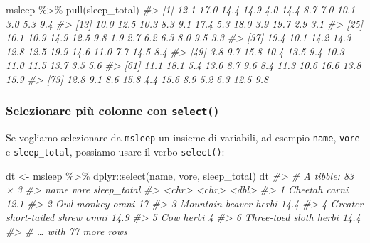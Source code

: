 \documentclass[
  10pt,
  italian,
  a4paper,
  extrafontsizes,onecolumn,openright
  ]{memoir}
\newenvironment{Shaded}{\begin{snugshade}}{\end{snugshade}}
\newcommand{\CommentTok}[1]{\textcolor[rgb]{0.56,0.35,0.01}{\textit{#1}}}
\newcommand{\FunctionTok}[1]{\textcolor[rgb]{0.00,0.00,0.00}{#1}}
\newcommand{\NormalTok}[1]{#1}
\newcommand{\OtherTok}[1]{\textcolor[rgb]{0.56,0.35,0.01}{#1}}
\newcommand{\SpecialCharTok}[1]{\textcolor[rgb]{0.00,0.00,0.00}{#1}}
\begin{document}
\begin{Shaded}
\begin{Highlighting}[]
\NormalTok{msleep }\SpecialCharTok{\%\textgreater{}\%} 
  \FunctionTok{pull}\NormalTok{(sleep\_total)}
\CommentTok{\#\textgreater{}  [1] 12.1 17.0 14.4 14.9  4.0 14.4  8.7  7.0 10.1  3.0  5.3  9.4}
\CommentTok{\#\textgreater{} [13] 10.0 12.5 10.3  8.3  9.1 17.4  5.3 18.0  3.9 19.7  2.9  3.1}
\CommentTok{\#\textgreater{} [25] 10.1 10.9 14.9 12.5  9.8  1.9  2.7  6.2  6.3  8.0  9.5  3.3}
\CommentTok{\#\textgreater{} [37] 19.4 10.1 14.2 14.3 12.8 12.5 19.9 14.6 11.0  7.7 14.5  8.4}
\CommentTok{\#\textgreater{} [49]  3.8  9.7 15.8 10.4 13.5  9.4 10.3 11.0 11.5 13.7  3.5  5.6}
\CommentTok{\#\textgreater{} [61] 11.1 18.1  5.4 13.0  8.7  9.6  8.4 11.3 10.6 16.6 13.8 15.9}
\CommentTok{\#\textgreater{} [73] 12.8  9.1  8.6 15.8  4.4 15.6  8.9  5.2  6.3 12.5  9.8}
\end{Highlighting}
\end{Shaded}

\hypertarget{selezionare-piuxf9-colonne-con-select}{%
\subsubsection{\texorpdfstring{Selezionare più colonne con \texttt{select()}}{Selezionare più colonne con select()}}\label{selezionare-piuxf9-colonne-con-select}}

Se vogliamo selezionare da \texttt{msleep} un insieme di variabili, ad esempio \texttt{name}, \texttt{vore} e \texttt{sleep\_total}, possiamo usare il verbo \texttt{select()}:

\begin{Shaded}
\begin{Highlighting}[]
\NormalTok{dt }\OtherTok{\textless{}{-}}\NormalTok{ msleep }\SpecialCharTok{\%\textgreater{}\%}
\NormalTok{  dplyr}\SpecialCharTok{::}\FunctionTok{select}\NormalTok{(name, vore, sleep\_total)}
\NormalTok{dt}
\CommentTok{\#\textgreater{} \# A tibble: 83 × 3}
\CommentTok{\#\textgreater{}   name                       vore  sleep\_total}
\CommentTok{\#\textgreater{}   \textless{}chr\textgreater{}                      \textless{}chr\textgreater{}       \textless{}dbl\textgreater{}}
\CommentTok{\#\textgreater{} 1 Cheetah                    carni        12.1}
\CommentTok{\#\textgreater{} 2 Owl monkey                 omni         17  }
\CommentTok{\#\textgreater{} 3 Mountain beaver            herbi        14.4}
\CommentTok{\#\textgreater{} 4 Greater short{-}tailed shrew omni         14.9}
\CommentTok{\#\textgreater{} 5 Cow                        herbi         4  }
\CommentTok{\#\textgreater{} 6 Three{-}toed sloth           herbi        14.4}
\CommentTok{\#\textgreater{} \# … with 77 more rows}
\end{Highlighting}
\end{Shaded}
\end{document}
